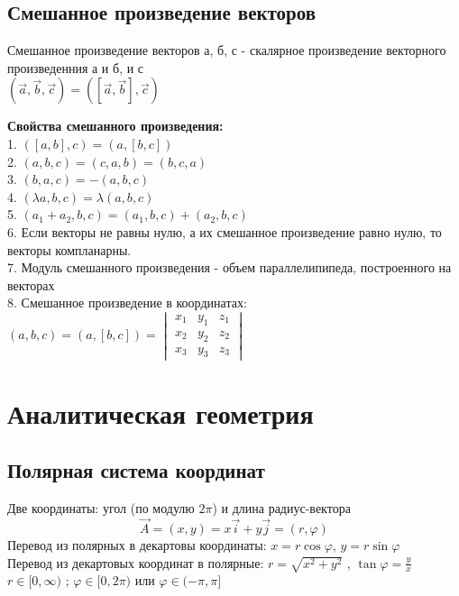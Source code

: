 \subsection{Смешанное произведение векторов}
\begin{defin}
Смешанное произведение векторов а, б, с - скалярное произведение
векторного произведенния а и б, и с\\
$(\Vec{a},\Vec{b},\Vec{c})=([\Vec{a},\Vec{b}],\Vec{c})$
\end{defin}
\textbf{Свойства смешанного произведения:}\\
1. $([a,b],c)=(a,[b,c])$\\
2. $(a,b,c)=(c,a,b)=(b,c,a)$\\
3. $(b,a,c)=-(a,b,c) $\\
4. $(\lambda a,b,c)=\lambda(a,b,c)$\\
5. $(a_1+a_2,b,c)=(a_1,b,c)+(a_2,b,c)$\\
6. Если векторы не равны нулю, а их смешанное произведение равно нулю,
то векторы компланарны.\\
7. Модуль смешанного произведения - объем параллелипипеда,
построенного на векторах\\
8. Смешанное произведение в координатах:
 $(a,b,c)=(a,[b,c])=\begin{vmatrix}x_1&y_1&z_1\\
x_2&y_2&z_2\\x_3&y_3&z_3\end{vmatrix}$

\section{Аналитическая геометрия}
\subsection{Полярная система координат}
Две координаты: угол (по модулю $2\pi$) и длина радиус-вектора
$$\Vec{A}=(x,y)=x\Vec{i}+y\Vec{j}=(r,\varphi)$$
Перевод из полярных в декартовы координаты: $x=r\cos\varphi$,
 $y=r\sin\varphi$\\
Перевод из декартовых координат в полярные: $r=\sqrt{x^2+y^2}$ , 
$\tan\varphi=\frac{y}{x}$\\
$r\in[0,\infty)$ ; $\varphi\in[0,2\pi)$ или $\varphi\in(-\pi,\pi]$

